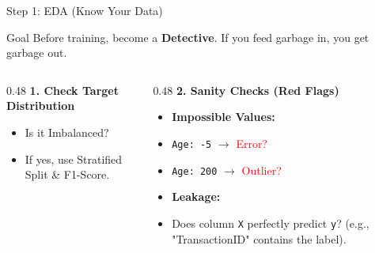 \begin{frame}{Step 1: EDA (Know Your Data)}

    \begin{block}{Goal}
        Before training, become a \textbf{Detective}. If you feed garbage in, you get garbage out.
    \end{block}

    \vspace{1em}
    
    \begin{columns}[T]
        \begin{column}{0.48\textwidth}
            \textbf{1. Check Target Distribution}
            \vspace{0.3em}
            \begin{tcolorbox}[colback=blue!5, boxrule=0pt]
                \centering
                \vspace{0.5em}
                \begin{itemize}
                    \item Is it Imbalanced?
                    \item If yes, use Stratified Split \& F1-Score.
                \end{itemize}
            \end{tcolorbox}
        \end{column}
        
        \begin{column}{0.48\textwidth}
            \textbf{2. Sanity Checks (Red Flags)}
            \vspace{0.3em}
            \begin{tcolorbox}[colback=red!5, boxrule=0pt]
                \centering
                \small
                \begin{itemize}
                    \item \textbf{Impossible Values:}
                    \item \texttt{Age: -5} $\rightarrow$ \textcolor{red}{Error?}
                    \item \texttt{Age: 200} $\rightarrow$ \textcolor{red}{Outlier?}
                    \item \textbf{Leakage:}
                    \item Does column \texttt{X} perfectly predict \texttt{y}? (e.g., "TransactionID" contains the label).
                \end{itemize}
            \end{tcolorbox}
        \end{column}
    \end{columns}
\end{frame}

